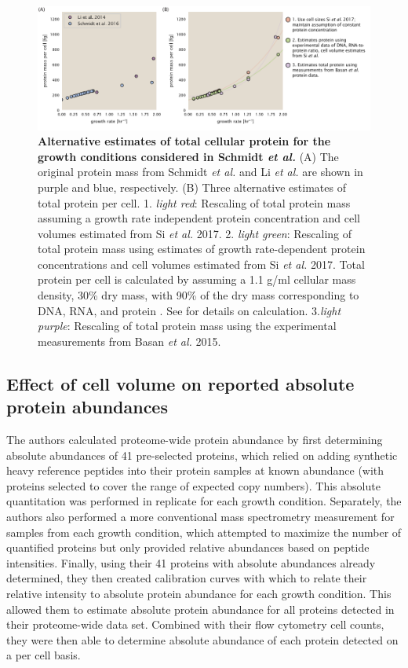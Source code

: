 \begin{figure}
		\centering
    \includegraphics[width=1\textwidth]{SI_figs/schmidt_protein_corrections.pdf}
  \caption{{\bf Alternative estimates of total cellular protein for the growth conditions
    considered in Schmidt \textit{et al.}} (A) The original protein mass from
    Schmidt \textit{et al.} and Li \textit{et al.} are shown in purple and blue,
    respectively. (B) Three alternative estimates of total protein per cell.
		1.  \textit{light red}: Rescaling of total protein mass assuming a
    growth rate independent protein concentration and cell volumes estimated
    from Si \textit{et al.} 2017. 2. \textit{light green}:  Rescaling of total protein
    mass using estimates of growth rate-dependent protein concentrations and
    cell volumes estimated from Si \textit{et al.} 2017. Total protein per cell
		is calculated by assuming a 1.1 g/ml cellular mass density, 30\% dry mass, with
		90\% of the dry mass corresponding to DNA, RNA, and protein \citep{basan2015}. See
		 for details on calculation. 3.\textit{light purple}: Rescaling
    of total protein mass using the experimental measurements from Basan
    \textit{et al.} 2015.
	 	}
  \label{fig:schmidt_adjustment_summary}
\end{figure}

\subsection{Effect of cell volume on reported absolute protein abundances}

The authors calculated proteome-wide  protein abundance by first determining
absolute abundances of 41 pre-selected proteins, which relied on adding
synthetic heavy reference peptides into their protein samples at known abundance
(with proteins selected to cover the range of expected copy numbers).  This
absolute quantitation was performed in replicate for each growth condition.
Separately, the authors also performed a more conventional mass spectrometry
measurement for samples from each growth condition, which attempted to maximize
the number of quantified proteins but only provided relative abundances based on
peptide intensities. Finally, using their 41 proteins with absolute abundances
already determined, they then created calibration curves with which to relate
their relative intensity to absolute protein abundance for each growth
condition.  This allowed them to estimate absolute protein abundance for all
proteins detected in their proteome-wide data set. Combined with their flow
cytometry cell counts, they were then able to determine absolute abundance of
each protein detected on a per cell basis.

